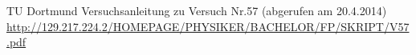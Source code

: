 \clearpage
\begin{thebibliography}{WissOnl}
	 TU Dortmund Versuchsanleitung zu Versuch Nr.57 (abgerufen am 20.4.2014) \url{http://129.217.224.2/HOMEPAGE/PHYSIKER/BACHELOR/FP/SKRIPT/V57.pdf}
\end{thebibliography}




